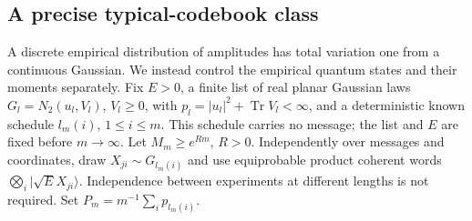 \documentclass[11pt]{article}
\newcommand{\Tr}{\operatorname{Tr}}
\begin{document}
\subsection{A precise typical-codebook class}

A discrete empirical distribution of amplitudes has total variation one
from a continuous Gaussian. We instead control the empirical quantum
states and their moments separately.
Fix \(E>0\), a finite list of real planar Gaussian laws
\(G_l=N_2(u_l,V_l)\), \(V_l\geq0\), with
\(p_l=|u_l|^2+\Tr V_l<\infty\), and a deterministic known schedule
\(l_m(i)\), \(1\leq i\leq m\). This schedule carries no message;
the list and \(E\) are fixed before \(m\to\infty\).
Let \(M_m\geq e^{Rm}\), \(R>0\). Independently over messages and
coordinates, draw \(X_{ji}\sim G_{l_m(i)}\) and use equiprobable
product coherent words \(\bigotimes_i|\sqrt E X_{ji}\rangle\).
Independence between experiments at different lengths is not required.
Set \(P_m=m^{-1}\sum_i p_{l_m(i)}\).
\end{document}
